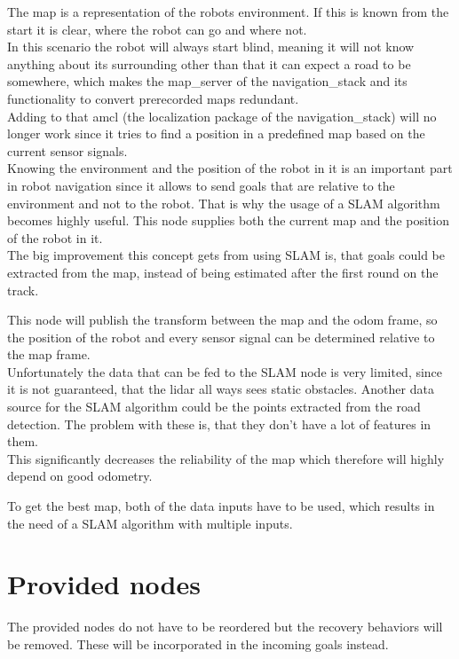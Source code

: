 The map is a representation of the robots environment. If this is known from the start it is clear, where the robot can go and where not.\\
 In this scenario the robot will always start blind, meaning it will not know anything about its surrounding other than that it can expect a road to be somewhere, which makes the map\_server of the navigation\_stack and its functionality to convert prerecorded maps redundant.\\
Adding to that amcl (the localization package of the navigation\_stack) will no longer work since it tries to find a position in a predefined map based on the current sensor signals.\\
Knowing the environment and the position of the robot in it is an important part in robot navigation since it allows to send goals that are relative to the environment and not to the robot. That is why the usage of a SLAM algorithm becomes highly useful. This node supplies both the current map and the position of the robot in it.\\
The big improvement this concept gets from using SLAM is, that goals could be extracted from the map, instead of being estimated after the first round on the track.

This node will publish the transform between the map and the odom frame, so the position of the robot and every sensor signal can be determined relative to the map frame.\\

Unfortunately the data that can be fed to the SLAM node is very limited, since it is not guaranteed, that the lidar all ways sees static obstacles. Another data source for the SLAM algorithm could be the points extracted from the road detection. The problem with these is, that they don't have a lot of features in them.\\

This significantly decreases the reliability of the map which therefore will highly depend on good odometry.

To get the best map, both of the data inputs have to be used, which results in the need of a SLAM algorithm with multiple inputs.\\

\section{Provided nodes}

The provided nodes do not have to be reordered but the recovery behaviors will be removed. These will be incorporated in the incoming goals instead.

